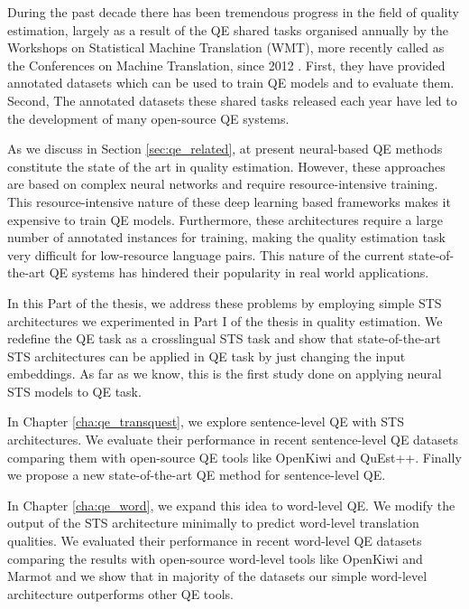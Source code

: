 During the past decade there has been tremendous progress in the field of quality estimation, largely as a result of the QE shared tasks organised annually by the Workshops on Statistical Machine Translation (WMT), more recently called as the Conferences on Machine Translation, since 2012  \cite{callison-burch-etal-2012-findings,bojar-etal-2013-findings,bojar-etal-2014-findings,bojar-etal-2015-findings,bojar-etal-2016-findings,bojar-etal-2017-findings,specia-etal-2018-findings,fonseca-etal-2019-findings,specia-etal-2020-findings-wmt}. First, they have provided annotated datasets which can be used to train QE models and to evaluate them. Second, The annotated datasets these shared tasks released each year have led to the development of many open-source QE systems. 

As we discuss in Section \ref{sec:qe_related}, at present neural-based QE methods constitute the state of the art in quality estimation. However, these approaches are based on complex neural networks and require resource-intensive training. This resource-intensive nature of these deep learning based frameworks makes it expensive to train QE models. Furthermore, these architectures require a large number of annotated instances for training, making the quality estimation task very difficult for low-resource language pairs. This nature of the current state-of-the-art QE systems has hindered their popularity in real world applications.

In this Part of the thesis, we address these problems by employing simple STS architectures we experimented in Part I of the thesis in quality estimation. We redefine the QE task as a crosslingual STS task and show that state-of-the-art STS architectures can be applied in QE task by just changing the input embeddings. As far as we know, this is the first study done on applying neural STS models to QE task. 

In Chapter \ref{cha:qe_transquest}, we explore sentence-level QE with STS architectures. We evaluate their performance in recent sentence-level QE datasets comparing them with open-source QE tools like OpenKiwi and QuEst++. Finally we propose a new state-of-the-art QE method for sentence-level QE.

In Chapter \ref{cha:qe_word}, we expand this idea to word-level QE. We modify the output of the STS architecture minimally to predict word-level translation qualities. We evaluated their performance in recent word-level QE datasets comparing the results with open-source word-level tools like OpenKiwi and Marmot and we show that in majority of the datasets our simple word-level architecture outperforms other QE tools. 

